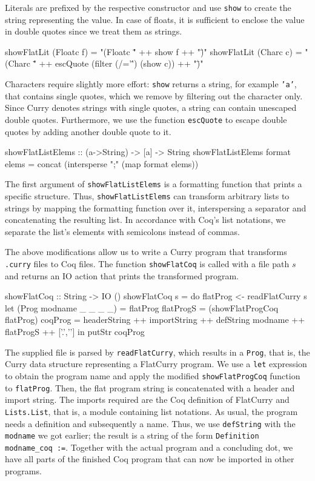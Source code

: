 \documentclass[paper = a4, fleqn, twoside]{scrreprt}
\newcommand{\coqinline}[1]{\texttt{#1}}
\begin{document}
\par
Literals are prefixed by the respective constructor and use \texttt{show} to create the string representing the value. In case of floats, it is sufficient to enclose the value in double quotes since we treat them as strings.
\begin{haskellcode}
showFlatLit (Floatc f) = "(Floatc \"" ++ show f ++ "\")"
showFlatLit (Charc  c) = "(Charc \"" ++ escQuote (filter (/='\'') (show c))
                         ++ "\")"
\end{haskellcode}
Characters require slightly more effort: \texttt{show} returns a string, for example \texttt{'a'}, that contains single quotes, which we remove by filtering out the character only. Since Curry denotes strings with single quotes, a string can contain unescaped double quotes. Furthermore, we use the function \texttt{escQuote} to escape double quotes by adding another double quote to it.
\begin{haskellcode}
showFlatListElems :: (a->String) -> [a] -> String
showFlatListElems format elems = concat (intersperse ";" (map format elems))
\end{haskellcode}
The first argument of \texttt{showFlatListElems} is a formatting function that prints a specific structure. Thus, \texttt{showFlatListElems} can transform arbitrary lists to strings by mapping the formatting function over it, interspersing a separator and concatenating the resulting list. In accordance with Coq's list notations, we separate the list's elements with semicolons instead of commas.\\
\par\noindent
The above modifications allow us to write a Curry program that transforms \texttt{.curry} files to Coq files. The function \texttt{showFlatCoq} is called with a file path $s$ and returns an IO action that prints the transformed program. 
\begin{haskellcode}
showFlatCoq :: String -> IO ()
showFlatCoq s = do flatProg  <- readFlatCurry s
                   let (Prog modname _ _ _ _) = flatProg
                       flatProgS = (showFlatProgCoq flatProg)
                       coqProg   = headerString ++ importString
                                   ++ defString modname ++ flatProgS
                                   ++ ['.','\n']
                    in putStr coqProg
\end{haskellcode}
The supplied file is parsed by \texttt{readFlatCurry}, which results in a \texttt{Prog}, that is, the Curry data structure representing a FlatCurry program. We use a \texttt{let} expression to obtain the program name and apply the modified \texttt{showFlatProgCoq} function to \texttt{flatProg}. Then, the flat program string is concatenated with a header and import string. The imports required are the Coq definition of FlatCurry and \texttt{Lists.List}, that is, a module containing list notations.
As usual, the program needs a definition and subsequently a name. Thus, we use \texttt{defString} with the \texttt{modname} we got earlier; the result is a string of the form \coqinline{Definition modname_coq :=}. Together with the actual program and a concluding dot, we have all parts of the finished Coq program that can now be imported in other programs.
\end{document}
